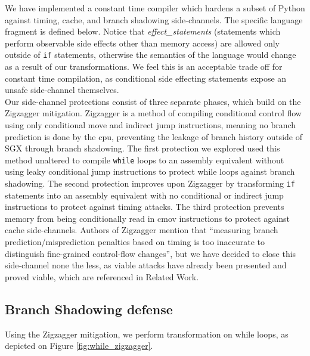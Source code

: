 \documentclass[sigplan, review]{acmart}
\begin{document}
We have implemented a constant time compiler which hardens a subset of Python against timing, cache, and branch shadowing side-channels. The specific language fragment is defined below. Notice that \textit{effect\_statements} (statements which perform observable side effects other than memory access) are allowed only outside of \texttt{if} statements, otherwise the semantics of the language would change as a result of our transformations. We feel this is an acceptable trade off for constant time compilation, as conditional side effecting statements expose an unsafe side-channel themselves.\\

Our side-channel protections consist of three separate phases, which build on the Zigzagger \cite{lee2016inferring} mitigation. Zigzagger is a method of compiling conditional control flow using only conditional move and indirect jump instructions, meaning no branch prediction is done by the cpu, preventing the leakage of branch history outside of SGX through branch shadowing. The first protection we explored used this method unaltered to compile \texttt{while} loops to an assembly equivalent without using leaky conditional jump instructions to protect while loops against branch shadowing. The second protection improves upon Zigzagger by transforming \texttt{if} statements into an assembly equivalent with no conditional or indirect jump instructions to protect against timing attacks. The third protection prevents memory from being conditionally read in cmov instructions to protect against cache side-channels. Authors of Zigzagger mention that “measuring branch prediction/misprediction penalties based on timing is too inaccurate to distinguish fine-grained control-flow changes”, but we have decided to close this side-channel none the less, as viable attacks have already been presented and proved viable, which are referenced in Related Work.\\
\subsection{Branch Shadowing defense}
Using the Zigzagger mitigation, we perform transformation on while loops, as depicted on Figure \ref{fig:while_zigzagger}.
\end{document}
